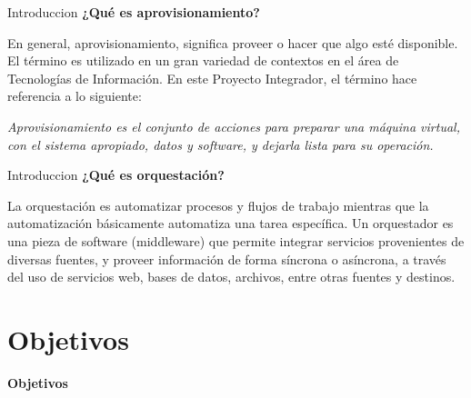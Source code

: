 \begin{frame}{Introduccion}
    \vspace{-1.5cm}
    \textbf{¿Qué es aprovisionamiento?}

    En general, aprovisionamiento, significa proveer o hacer que algo esté disponible. El término es utilizado en un gran variedad de contextos en el área de Tecnologías de Información. En este Proyecto Integrador, el término hace referencia a lo siguiente:

    \begin{block}{}
    \textit
    {
        Aprovisionamiento es el conjunto de acciones para preparar una máquina virtual, con el sistema apropiado, datos y software, y dejarla lista para su operación.
    }
    \end{block}

\end{frame}

\begin{frame}{Introduccion}
    \vspace{-1.5cm}
    \textbf{¿Qué es orquestación?}

    La orquestación es automatizar procesos y flujos de trabajo mientras que la automatización básicamente automatiza una tarea específica.
    Un orquestador es una pieza de software (middleware) que permite integrar servicios provenientes de diversas fuentes, y proveer información de forma síncrona o asíncrona, a través del uso de servicios web, bases de datos, archivos, entre otras fuentes y destinos.

\end{frame}
\section{Objetivos}

\begin{frame}
    \Huge
    \centering
    \textbf{ Objetivos }

\end{frame}

